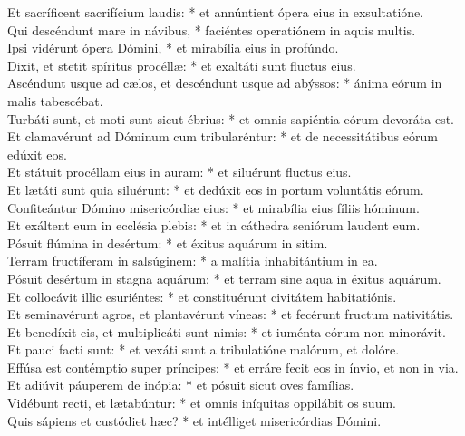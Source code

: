 {	Et sacríficent sacrifícium laudis: * et annúntient ópera eius in exsultatióne. \\
	Qui descéndunt mare in návibus, * faciéntes operatiónem in aquis multis. \\
	Ipsi vidérunt ópera Dómini, * et mirabília eius in profúndo. \\
	Dixit, et stetit spíritus procéllæ: * et exaltáti sunt fluctus eius. \\
	Ascéndunt usque ad cælos, et descéndunt usque ad abýssos: * ánima eórum in malis tabescébat. \\
	Turbáti sunt, et moti sunt sicut ébrius: * et omnis sapiéntia eórum devoráta est. \\
	Et clamavérunt ad Dóminum cum tribularéntur: * et de necessitátibus eórum edúxit eos. \\
	Et státuit procéllam eius in auram: * et siluérunt fluctus eius. \\
	Et lætáti sunt quia siluérunt: * et dedúxit eos in portum voluntátis eórum. \\
	Confiteántur Dómino misericórdiæ eius: * et mirabília eius fíliis hóminum. \\
	Et exáltent eum in ecclésia plebis: * et in cáthedra seniórum laudent eum. \\
	Pósuit flúmina in desértum: * et éxitus aquárum in sitim. \\
	Terram fructíferam in salsúginem: * a malítia inhabitántium in ea. \\
	Pósuit desértum in stagna aquárum: * et terram sine aqua in éxitus aquárum. \\
	Et collocávit illic esuriéntes: * et constituérunt civitátem habitatiónis. \\
	Et seminavérunt agros, et plantavérunt víneas: * et fecérunt fructum nativitátis. \\
	Et benedíxit eis, et multiplicáti sunt nimis: * et iuménta eórum non minorávit. \\
	Et pauci facti sunt: * et vexáti sunt a tribulatióne malórum, et dolóre. \\
	Effúsa est contémptio super príncipes: * et erráre fecit eos in ínvio, et non in via. \\
	Et adiúvit páuperem de inópia: * et pósuit sicut oves famílias. \\
	Vidébunt recti, et lætabúntur: * et omnis iníquitas oppilábit os suum. \\
	Quis sápiens et custódiet hæc? * et intélliget misericórdias Dómini. \\
}

